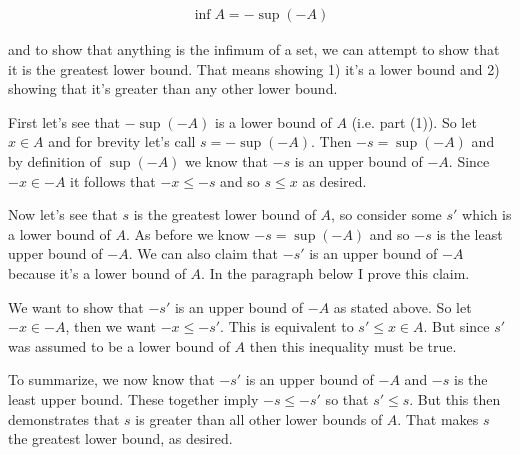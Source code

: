 \documentclass{article}
\begin{document}
	\begin{align*}
		\inf A = -\sup (-A)
	\end{align*}

	and to show that anything is the infimum of a set, we can attempt to show that it is the greatest lower bound.  That means showing 1) it's a lower bound and 2) showing that it's greater than any other lower bound.

	First let's see that $-\sup (-A)$ is a lower bound of $A$ (i.e. part (1)).  So let $x\in A$ and for brevity let's call $s = -\sup(-A)$.  Then $-s = \sup (-A)$ and by definition of $\sup(-A)$ we know that $-s$ is an upper bound of $-A$.  Since $-x\in -A$ it follows that $-x\leq -s$ and so $s\leq x$ as desired.

	Now let's see that $s$ is the greatest lower bound of $A$, so consider some $s'$ which is a lower bound of $A$.  As before we know $-s = \sup (-A)$ and so $-s$ is the least upper bound of $-A$.  We can also claim that $-s'$ is an upper bound of $-A$ because it's a lower bound of $A$.  In the paragraph below I prove this claim.

	We want to show that $-s'$ is an upper bound of $-A$ as stated above.  So let $-x\in -A$, then we want $-x\leq -s'$.  This is equivalent to $s' \leq x \in A$.  But since $s'$ was assumed to be a lower bound of $A$ then this inequality must be true.

	To summarize, we now know that $-s'$ is an upper bound of $-A$ and $-s$ is the least upper bound.  These together imply $-s \leq -s'$ so that $s' \leq s$.  But this then demonstrates that $s$ is greater than all other lower bounds of $A$.  That makes $s$ the greatest lower bound, as desired.
\end{document}
